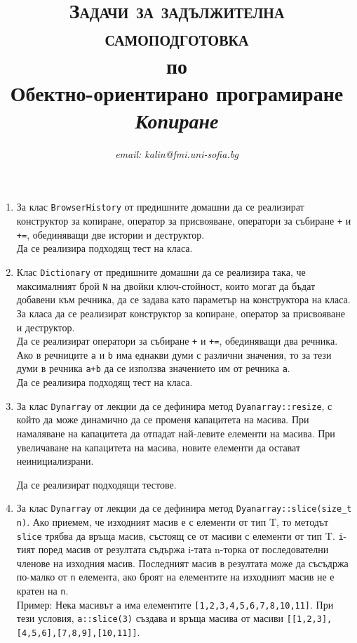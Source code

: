 \documentclass[12pt,a4paper]{article}
\author{\textit{email: kalin@fmi.uni-sofia.bg}}
\title{\textsc{Задачи за задължителна самоподготовка} \\
по \\
Обектно-ориентирано програмиране\\
\textit{Копиране}}
\newcommand{\code}[1]{\texttt{#1}}
\begin{document}
\maketitle


\begin{enumerate}

\item За клас \code{BrowserHistory} от предишните домашни да се реализират конструктор за копиране, оператор за присвояване, оператори за събиране \code{+} и \code{+=}, обединяващи две истории и деструктор.\\

Да се реализира подходящ тест на класа.

\item Клас \code{Dictionary} от предишните домашни да се реализира така, че максималният брой \code{N} на двойки ключ-стойност, които могат да бъдат добавени към речника, да се задава като параметър на конструктора на класа. За класа да се реализират конструктор за копиране, оператор за присвояване и деструктор.\\

Да се реализират оператори за събиране \code{+} и \code{+=}, обединяващи два речника. Ако в речниците \code{a} и \code{b} има еднакви думи с различни значения, то за тези думи в речника \code{a+b} да се използва значението им от речника \code{a}. \\

Да се реализира подходящ тест на класа.

\item За клас \code{Dynarray} от лекции да се дефинира метод \code{Dyanarray::resize}, с който да може динамично да се променя капацитета на масива. При намаляване на капацитета да отпадат най-левите елементи на масива. При увеличаване на капацитета на масива, новите елементи да остават неинициализрани.

Да се реализират подходящи тестове.

\item За клас \code{Dynarray} от лекции да се дефинира метод \code{Dyanarray::slice(size\_t n)}. Ако приемем, че изходният масив е  с елементи от тип T, то методът \code{slice} трябва да връща масив, състоящ се от масиви с елементи от тип T. \code{i}-тият поред масив от резултата съдържа i-тата n-торка от последователни членове на изходния масив. Последният масив в резултата може да съсъдржа по-малко от \code{n} елемента, ако броят на елементите на изходният масив не е кратен на \code{n}.\\

Пример: Нека масивът \code{a} има елементите \code{[1,2,3,4,5,6,7,8,10,11]}. При тези условия, \code{a::slice(3)} създава и връща масива от масиви \code{[[1,2,3],[4,5,6],[7,8,9],[10,11]]}.




\end{enumerate}


	\vspace{20px}
\end{document}
